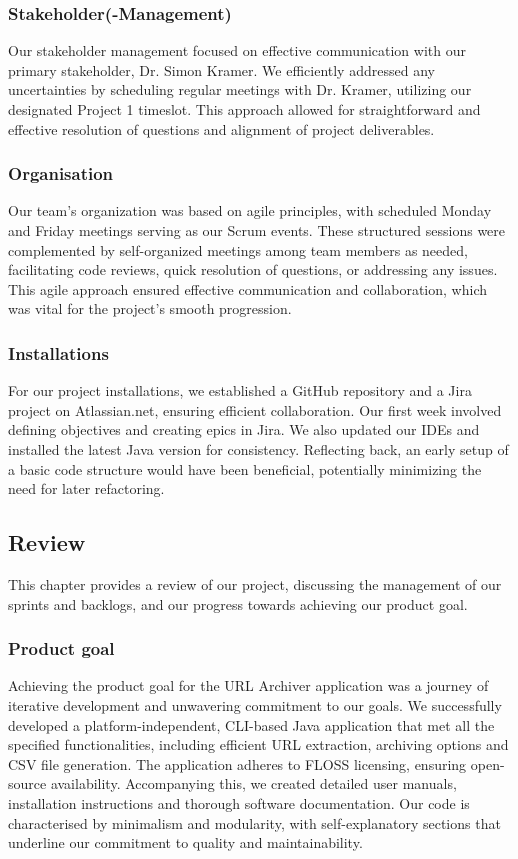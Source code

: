 \subsubsection{Stakeholder(-Management)}
Our stakeholder management focused on effective communication with our primary stakeholder, Dr. Simon Kramer.
We efficiently addressed any uncertainties by scheduling regular meetings with Dr. Kramer, utilizing our designated Project 1 timeslot.
This approach allowed for straightforward and effective resolution of questions and alignment of project deliverables.

\subsubsection{Organisation}
Our team's organization was based on agile principles, with scheduled Monday and Friday meetings serving as our Scrum events.
These structured sessions were complemented by self-organized meetings among team members as needed, facilitating code reviews, quick resolution of questions, or addressing any issues.
This agile approach ensured effective communication and collaboration, which was vital for the project's smooth progression.

\subsubsection{Installations}
For our project installations, we established a GitHub repository and a Jira project on Atlassian.net, ensuring efficient collaboration.
Our first week involved defining objectives and creating epics in Jira.
We also updated our IDEs and installed the latest Java version for consistency.
Reflecting back, an early setup of a basic code structure would have been beneficial, potentially minimizing the need for later refactoring.

\clearpage
\subsection{Review}
This chapter provides a review of our project, discussing the management of our sprints and backlogs, and our progress towards achieving our product goal.

\subsubsection{Product goal}
Achieving the product goal for the URL Archiver application was a journey of iterative development and unwavering commitment to our goals.
We successfully developed a platform-independent, CLI-based Java application that met all the specified functionalities, including efficient URL extraction, archiving options and CSV file generation.
The application adheres to FLOSS licensing, ensuring open-source availability.
Accompanying this, we created detailed user manuals, installation instructions and thorough software documentation.
Our code is characterised by minimalism and modularity, with self-explanatory sections that underline our commitment to quality and maintainability.

